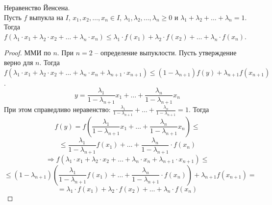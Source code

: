     \begin{theorem}{Неравенство Йенсена.} \\
        Пусть $f$ выпукла на $I$, $x_1, x_2, \dots, x_n \in I$,
        $\lambda_1, \lambda_2, \dots, \lambda_n \geq 0$ и $\lambda_1 + \lambda_2 + \dots + \lambda_n = 1$.
        Тогда $f(\lambda_1\cdot x_1 + \lambda_2\cdot x_2 + \dots + \lambda_n\cdot x_n) \leq \lambda_1\cdot f(x_1) + \lambda_2\cdot f(x_2) + \dots + \lambda_n\cdot f(x_n)$.
    \end{theorem}
    
    \begin{proof}
        ММИ по $n$. При $n = 2$ -- определение выпуклости.
        Пусть утверждение верно для $n$.
        Тогда $f(\lambda_1\cdot x_1 + \lambda_2\cdot x_2 + \dots + \lambda_n\cdot x_n + \lambda_{n+1}\cdot x_{n+1}) \leq (1-\lambda_{n+1})f(y) + \lambda_{n+1}f(x_{n+1})$.
        \[y = \frac{\lambda_1}{1 - \lambda_{n+1}}x_1 + \dots + \frac{\lambda_n}{1 - \lambda_{n+1}}x_n\]
        При этом справедливо неравенство: $\frac{\lambda_1}{1 - \lambda_{n+1}} + \dots + \frac{\lambda_n}{1 - \lambda_{n+1}} = 1$. Тогда
        \[f(y) = f(\frac{\lambda_1}{1 - \lambda_{n+1}}x_1 + \dots + \frac{\lambda_n}{1 - \lambda_{n+1}}x_n) \leq \]
        \[\leq \frac{\lambda_1}{1 - \lambda_{n+1}}f(x_1) + \dots + \frac{\lambda_n}{1 - \lambda_{n+1}}\cdot f(x_n)\]
        \[\Rightarrow f(\lambda_1\cdot x_1 + \lambda_2\cdot x_2 + \dots + \lambda_n\cdot x_n + \lambda_{n+1}\cdot x_{n+1}) \leq\]
        \[\leq (1-\lambda_{n+1})(\frac{\lambda_1}{1 - \lambda_{n+1}}f(x_1) + \dots + \frac{\lambda_n}{1 - \lambda_{n+1}}\cdot f(x_n)) + \lambda_{n+1}f(x_{n+1}) =\]
        \[= \lambda_1\cdot f(x_1) + \lambda_2\cdot f(x_2) + \dots + \lambda_n\cdot f(x_n)\]
    \end{proof}
